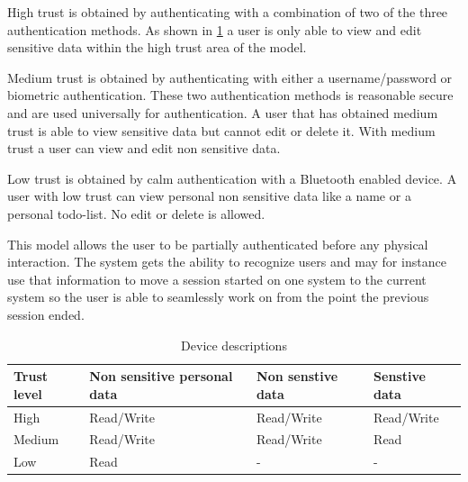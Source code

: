 High trust is obtained by authenticating with a combination of two of the three authentication methods.
As shown in \cref{table_data_access} a user is only able to view and edit sensitive data within the high trust area of the model.

Medium trust is obtained by authenticating with either a username/password or biometric authentication.
These two authentication methods is reasonable secure and are used universally for authentication.
A user that has obtained medium trust is able to view sensitive data but cannot edit or delete it.
With medium trust a user can view and edit non sensitive data.

Low trust is obtained by calm authentication with a Bluetooth enabled device.
A user with low trust can view personal non sensitive data like a name or a personal todo-list.
No edit or delete is allowed.

This model allows the user to be partially authenticated before any physical interaction.
The system gets the ability to recognize users and may for instance use that information to move a session started on one system to the current system so the user is able to seamlessly work on from the point the previous session ended.

\begin{table}[!t]
\caption{Device descriptions}
\label{table_data_access}
\centering
\begin{tabular}{|p{1.3cm}|p{2.0cm}|p{2.0cm}|p{2.0cm}|}
\hline
\textbf{Trust level} & \textbf{Non sensitive personal data} & \textbf{Non senstive data} & \textbf{Senstive data}\\
\hline
High & Read/Write & Read/Write & Read/Write\\
\hline
Medium & Read/Write & Read/Write & Read\\
\hline
Low & Read & - & -\\
\hline
\end{tabular}
\end{table}